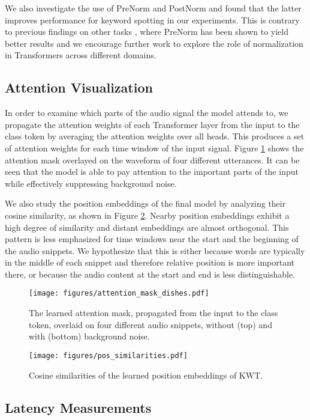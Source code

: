 \documentclass[a4paper]{article}
\begin{document}
We also investigate the use of PreNorm and PostNorm and found that the latter improves performance for keyword spotting in our experiments. This is contrary to previous findings on other tasks \cite{nguyen2019Transformers}, where PreNorm has been shown to yield better results and we encourage further work to explore the role of normalization in Transformers across different domains.

\subsection{Attention Visualization}
In order to examine which parts of the audio signal the model attends to, we propagate the attention weights of each Transformer layer from the input to the class token by averaging the attention weights over all heads. This produces a set of attention weights for each time window of the input signal. Figure \ref{fig:mask} shows the attention mask overlayed on the waveform of four different utterances. It can be seen that the model is able to pay attention to the important parts of the input while effectively suppressing  background noise. 

We also study the position embeddings of the final model by analyzing their cosine similarity, as shown in Figure \ref{fig:pos_similar}. Nearby position embeddings exhibit a high degree of similarity and distant embeddings are almost orthogonal.
This pattern is less emphasized for time windows near the start and the beginning of the audio snippets. We hypothesize that this is either because words are typically in the middle of each snippet and therefore relative position is more important there, or because the audio content at the start and end is less distinguishable.

\begin{figure}[t]
  \centering
  \texttt{[image: figures/attention\_mask\_dishes.pdf]}
  \caption{The learned attention mask, propagated from the input to the class token, overlaid on four different audio snippets, without (top) and with (bottom) background noise.}
  \label{fig:mask}
\end{figure}

\begin{figure}[b]
  \centering
  \texttt{[image: figures/pos\_similarities.pdf]}
  \caption{Cosine similarities of the learned position embeddings of KWT.}
  \label{fig:pos_similar}
\end{figure}

\subsection{Latency Measurements}
\end{document}
